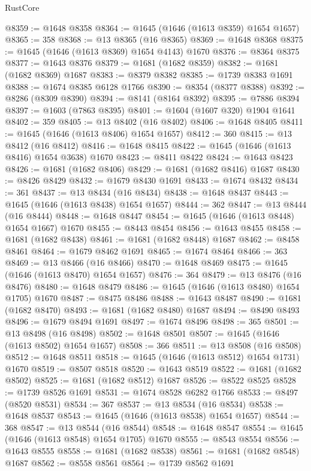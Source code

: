 \begin{lexlean}{RustCore}
\begin{coremodule}
@8359 := @1648 @8358
@8364 := @1645 (@1646 (@1613 @8359) @1654 @1657)
@8365 := 358
@8368 := @13 @8365 (@16 @8365)
@8369 := @1648 @8368
@8375 := @1645 (@1646 (@1613 @8369) @1654 @4143) @1670
@8376 := @8364 @8375
@8377 := @1643 @8376
@8379 := @1681 (@1682 @8359)
@8382 := @1681 (@1682 @8369) @1687
@8383 := @8379 @8382
@8385 := @1739 @8383 @1691
@8388 := @1674 @8385 @6128 @1766
@8390 := @8354 (@8377 @8388)
@8392 := @8286 (@8309 @8390)
@8394 := @8141 (@8164 @8392)
@8395 := @7886 @8394
@8397 := @1603 (@7863 @8395)
@8401 := @1604 (@1607 @320) @1904 @1641
@8402 := 359
@8405 := @13 @8402 (@16 @8402)
@8406 := @1648 @8405
@8411 := @1645 (@1646 (@1613 @8406) @1654 @1657)
@8412 := 360
@8415 := @13 @8412 (@16 @8412)
@8416 := @1648 @8415
@8422 := @1645 (@1646 (@1613 @8416) @1654 @3638) @1670
@8423 := @8411 @8422
@8424 := @1643 @8423
@8426 := @1681 (@1682 @8406)
@8429 := @1681 (@1682 @8416) @1687
@8430 := @8426 @8429
@8432 := @1679 @8430 @1691
@8433 := @1674 @8432
@8434 := 361
@8437 := @13 @8434 (@16 @8434)
@8438 := @1648 @8437
@8443 := @1645 (@1646 (@1613 @8438) @1654 @1657)
@8444 := 362
@8447 := @13 @8444 (@16 @8444)
@8448 := @1648 @8447
@8454 := @1645 (@1646 (@1613 @8448) @1654 @1667) @1670
@8455 := @8443 @8454
@8456 := @1643 @8455
@8458 := @1681 (@1682 @8438)
@8461 := @1681 (@1682 @8448) @1687
@8462 := @8458 @8461
@8464 := @1679 @8462 @1691
@8465 := @1674 @8464
@8466 := 363
@8469 := @13 @8466 (@16 @8466)
@8470 := @1648 @8469
@8475 := @1645 (@1646 (@1613 @8470) @1654 @1657)
@8476 := 364
@8479 := @13 @8476 (@16 @8476)
@8480 := @1648 @8479
@8486 := @1645 (@1646 (@1613 @8480) @1654 @1705) @1670
@8487 := @8475 @8486
@8488 := @1643 @8487
@8490 := @1681 (@1682 @8470)
@8493 := @1681 (@1682 @8480) @1687
@8494 := @8490 @8493
@8496 := @1679 @8494 @1691
@8497 := @1674 @8496
@8498 := 365
@8501 := @13 @8498 (@16 @8498)
@8502 := @1648 @8501
@8507 := @1645 (@1646 (@1613 @8502) @1654 @1657)
@8508 := 366
@8511 := @13 @8508 (@16 @8508)
@8512 := @1648 @8511
@8518 := @1645 (@1646 (@1613 @8512) @1654 @1731) @1670
@8519 := @8507 @8518
@8520 := @1643 @8519
@8522 := @1681 (@1682 @8502)
@8525 := @1681 (@1682 @8512) @1687
@8526 := @8522 @8525
@8528 := @1739 @8526 @1691
@8531 := @1674 @8528 @6282 @1766
@8533 := @8497 (@8520 @8531)
@8534 := 367
@8537 := @13 @8534 (@16 @8534)
@8538 := @1648 @8537
@8543 := @1645 (@1646 (@1613 @8538) @1654 @1657)
@8544 := 368
@8547 := @13 @8544 (@16 @8544)
@8548 := @1648 @8547
@8554 := @1645 (@1646 (@1613 @8548) @1654 @1705) @1670
@8555 := @8543 @8554
@8556 := @1643 @8555
@8558 := @1681 (@1682 @8538)
@8561 := @1681 (@1682 @8548) @1687
@8562 := @8558 @8561
@8564 := @1739 @8562 @1691

\end{coremodule}
\end{lexlean}
